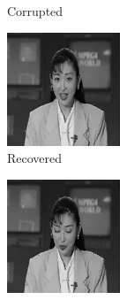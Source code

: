\begin{figure}
\begin{subfigure}{0.4\textwidth}
    \caption{Corrupted}
  \end{subfigure}
  \begin{subfigure}{0.4\textwidth}
    \centering
    \includegraphics[width=.9\textwidth]{Chapter7/Images/akiyo70_rec_32.png}
    \caption{Recovered}
  \end{subfigure}
  \begin{subfigure}{0.4\textwidth}
    \centering
    \includegraphics[width=.9\textwidth]{Chapter7/Images/akiyo70_rec_52.png}

\end{subfigure}
\end{figure}
